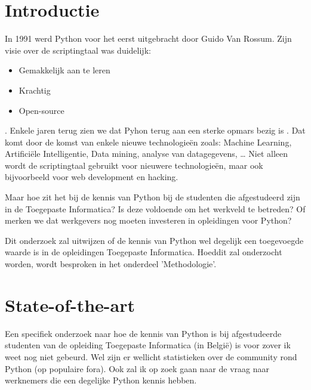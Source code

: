 
\section{Introductie} %
\label{sec:introductie}

In 1991 werd Python voor het eerst uitgebracht door Guido Van Rossum. Zijn visie over de scriptingtaal was duidelijk:
\begin{itemize}
	\item Gemakkelijk aan te leren
	\item Krachtig
	\item Open-source
\end{itemize}
\autocite{GVR2016}. Enkele jaren terug zien we dat Pyhon terug aan een sterke opmars bezig is \autocite{SO2017}. Dat komt door de komst van enkele nieuwe technologieën zoals: Machine Learning, Artificiële Intelligentie, Data mining, analyse van datagegevens, … Niet alleen wordt de scriptingtaal gebruikt voor nieuwere technologieën, maar ook bijvoorbeeld voor web development en hacking.
 
Maar hoe zit het bij de kennis van Python bij de studenten die afgestudeerd zijn in de Toegepaste Informatica? Is deze voldoende om het werkveld te betreden? Of merken we dat werkgevers nog moeten investeren in opleidingen voor Python? 

Dit onderzoek zal uitwijzen of de kennis van Python wel degelijk een toegevoegde waarde is in de opleidingen Toegepaste Informatica. Hoeddit zal onderzocht worden, wordt besproken in het onderdeel 'Methodologie'.


\section{State-of-the-art}
\label{sec:state-of-the-art}

Een specifiek onderzoek naar hoe de kennis van Python is bij afgestudeerde studenten van de opleiding Toegepaste Informatica (in België) is voor zover ik weet nog niet gebeurd. Wel zijn er wellicht statistieken over de community rond Python (op populaire fora). Ook zal ik op zoek gaan naar de vraag naar werknemers die een degelijke Python kennis hebben.


